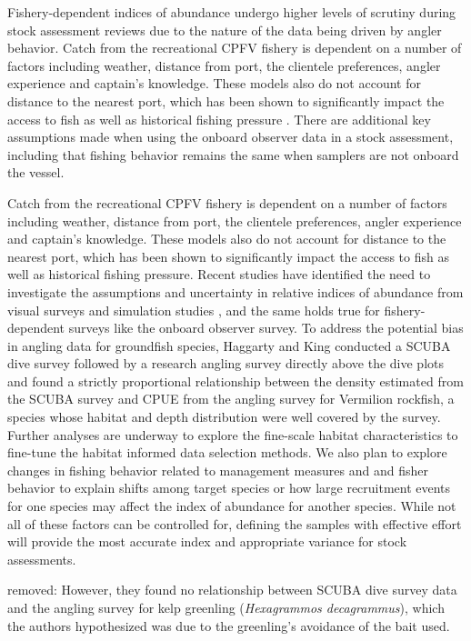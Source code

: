 \documentclass[
  12pt,
  authoryear,
  preprint,
  3p]{elsarticle}
\begin{document}
Fishery-dependent indices of abundance undergo higher levels of scrutiny
during stock assessment reviews due to the nature of the data being
driven by angler behavior. Catch from the recreational CPFV fishery is
dependent on a number of factors including weather, distance from port,
the clientele preferences, angler experience and captain's knowledge.
These models also do not account for distance to the nearest port, which
has been shown to significantly impact the access to fish as well as
historical fishing pressure \citep{Miller:2014:SDH}. There are
additional key assumptions made when using the onboard observer data in
a stock assessment, including that fishing behavior remains the same
when samplers are not onboard the vessel.

Catch from the recreational CPFV fishery is dependent on a number of
factors including weather, distance from port, the clientele
preferences, angler experience and captain's knowledge. These models
also do not account for distance to the nearest port, which has been
shown to significantly impact the access to fish as well as historical
fishing pressure. Recent studies have identified the need to investigate
the assumptions and uncertainty in relative indices of abundance from
visual surveys \citep{Bacheler:2015:ERA, Campbell:2015:CRA} and
simulation studies \citep{Siegfried:2016:ISA}, and the same holds true
for fishery-dependent surveys like the onboard observer survey. To
address the potential bias in angling data for groundfish species,
Haggarty and King \citeyearpar{Haggarty:2006:CIR} conducted a SCUBA dive
survey followed by a research angling survey directly above the dive
plots and found a strictly proportional relationship between the density
estimated from the SCUBA survey and CPUE from the angling survey for
Vermilion rockfish, a species whose habitat and depth distribution were
well covered by the survey. Further analyses are underway to explore the
fine-scale habitat characteristics to fine-tune the habitat informed
data selection methods. We also plan to explore changes in fishing
behavior related to management measures and and fisher behavior to
explain shifts among target species or how large recruitment events for
one species may affect the index of abundance for another species. While
not all of these factors can be controlled for, defining the samples
with effective effort will provide the most accurate index and
appropriate variance for stock assessments.

removed: However, they found no relationship between SCUBA dive survey
data and the angling survey for kelp greenling (\emph{Hexagrammos
decagrammus}), which the authors hypothesized was due to the greenling's
avoidance of the bait used.
\end{document}
